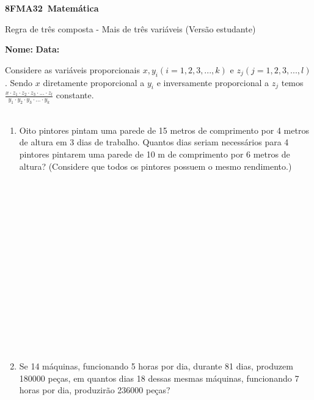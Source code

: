 \documentclass[a4paper,14pt]{article}
\begin{document}
	
	\noindent\textbf{8FMA32~Matemática} 
	
	\begin{center}Regra de três composta - Mais de três variáveis (Versão estudante)
	\end{center}
	
	\noindent\textbf{Nome:} \underline{\hspace{10cm}}
	\noindent\textbf{Data:} \underline{\hspace{4cm}}
	
	
    \begin{multicols}{2}
    	Considere as variáveis proporcionais $x, y_i(i=1, 2, 3, ..., k)$ e $z_j(j=1, 2, 3, ..., l)$. Sendo $x$ diretamente proporcional a $y_i$ e inversamente proporcional a $z_j$ temos $\frac{x \cdot z_1 \cdot z_2 \cdot z_3 \cdot ... \cdot z_l}{y_1 \cdot y_2 \cdot y_3 \cdot ... \cdot y_k}$ constante. \\\\
		\begin{enumerate}
			\item Oito pintores pintam uma parede de 15 metros de comprimento por 4 metros de altura em 3 dias de trabalho. Quantos dias seriam necessários para 4 pintores pintarem uma parede de 10 m de comprimento por 6 metros de altura? (Considere que todos os pintores possuem o mesmo rendimento.) \\\\\\\\\\\\\\\\\\\\\\\\\\\\\\\\
			\item Se 14 máquinas, funcionando 5 horas por dia, durante 81 dias, produzem 180000 peças, em quantos dias 18 dessas mesmas máquinas, funcionando 7 horas por dia, produzirão 236000 peças? \\\\\\\\\\\\\\\\\\\\

\end{enumerate}
\end{multicols}
\end{document}
